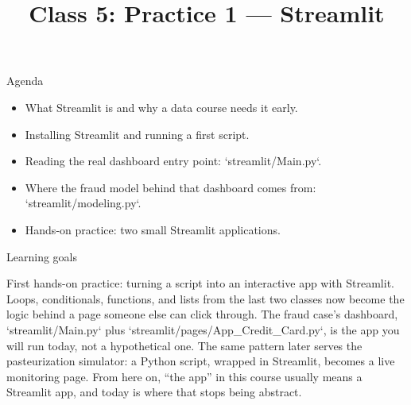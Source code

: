 

\title{Class 5: Practice 1 --- Streamlit}
\author{\coursename}
\date{}



\frame{\titlepage \coursefooter}

\begin{frame}{Agenda}
\begin{itemize}
\item What Streamlit is and why a data course needs it early.
\item Installing Streamlit and running a first script.
\item Reading the real dashboard entry point: `streamlit/Main.py`.
\item Where the fraud model behind that dashboard comes from: `streamlit/modeling.py`.
\item Hands-on practice: two small Streamlit applications.
\end{itemize}
\coursefooter
\end{frame}

\begin{frame}{Learning goals}
\coursefooter
\end{frame}

\coursecontextframe
{First hands-on practice: turning a script into an interactive app with Streamlit.}
{Loops, conditionals, functions, and lists from the last two classes now become the logic behind a page someone else can click through.}
{The fraud case's dashboard, `streamlit/Main.py` plus `streamlit/pages/App_Credit_Card.py`, is the app you will run today, not a hypothetical one.}
{The same pattern later serves the pasteurization simulator: a Python script, wrapped in Streamlit, becomes a live monitoring page.}
{From here on, ``the app'' in this course usually means a Streamlit app, and today is where that stops being abstract.}

